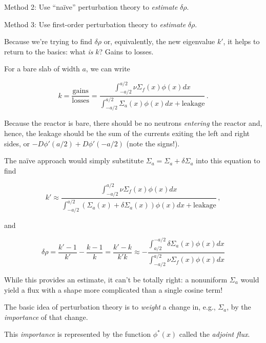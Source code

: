 \documentclass[compact]{ne630handout}
\begin{document}
\begin{handoutflow}
Method 2: Use ``naïve'' perturbation theory to \emph{estimate} \(\delta\rho\).

Method 3: Use first-order perturbation theory to \emph{estimate} \(\delta\rho\).


Because we're trying to find \(\delta \rho\) or, equivalently, the new eigenvalue \(k'\), it helps to return to the basics: what \emph{is} \(k\)? Gains to losses.

For a bare slab of width \(a\), we can write

\[
  k = \frac{\text{gains}}{\text{losses}} =
  \frac{\int^{a/2}_{-a/2} \nu\Sigma_f(x) \phi(x) dx}
       {\int^{a/2}_{-a/2} \Sigma_a(x) \phi(x) dx + \text{leakage}} \, .
\]

Because the reactor is bare, there should be no neutrons \emph{entering} the reactor and, hence, the leakage should be the sum of the currents exiting the left and right sides, or \(-D \phi'(a/2) + D \phi'(-a/2)\) (note the signs!).

The naïve approach would simply substitute \(\Sigma_a = \Sigma_a + \delta \Sigma_a\) into this equation to find

\[
  k' \approx
  \frac{\int^{a/2}_{-a/2} \nu\Sigma_f(x) \phi(x) dx}
       {\int^{a/2}_{-a/2} (\Sigma_a(x)+\delta \Sigma_a(x)) \phi(x) dx + \text{leakage}} \, ,
\]

and

\[
 \delta \rho = \frac{k'-1}{k'} - \frac{k-1}{k} = \frac{k'-k}{k'k} \approx
- \frac{ \displaystyle \int_{a/2}^{-a/2}
   \delta\Sigma_a(x) \phi(x) dx}
   { \displaystyle \int_{-a/2}^{a/2}  \nu\Sigma_f(x) \phi(x) dx}
   \tag{1}
\]

While this provides an estimate, it can't be totally right: a nonuniform \(\Sigma_a\) would yield a flux with a shape more complicated than a single cosine term!


The basic idea of perturbation theory is to \emph{weight} a change in, e.g., \(\Sigma_a\), by the \emph{importance} of that change.

This \emph{importance} is represented by the function \(\phi^*(x)\) called the \emph{adjoint flux}.


\end{handoutflow}
\end{document}
